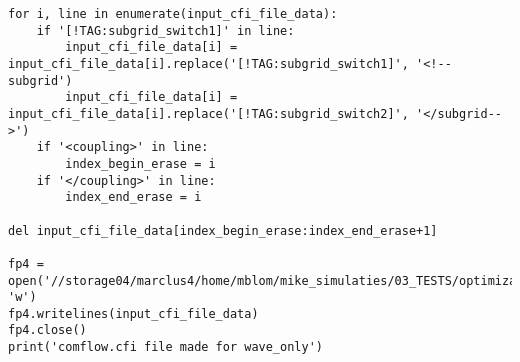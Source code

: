 \begin{mdframed}[backgroundcolor=light-gray, roundcorner=10pt,leftmargin=1, rightmargin=1, innerleftmargin=0, innertopmargin=7,innerbottommargin=0, outerlinewidth=1, linecolor=light-gray]
\begin{lstlisting}[linewidth=\columnwidth,caption= Script for creating comflow.cfi and  breakwater.in files ., label=script: creating comflow.cfi and breakwater.in]
for i, line in enumerate(input_cfi_file_data):
    if '[!TAG:subgrid_switch1]' in line:
        input_cfi_file_data[i] = input_cfi_file_data[i].replace('[!TAG:subgrid_switch1]', '<!--subgrid')
        input_cfi_file_data[i] = input_cfi_file_data[i].replace('[!TAG:subgrid_switch2]', '</subgrid-->')
    if '<coupling>' in line:
        index_begin_erase = i
    if '</coupling>' in line:
        index_end_erase = i

del input_cfi_file_data[index_begin_erase:index_end_erase+1]

fp4 = open('//storage04/marclus4/home/mblom/mike_simulaties/03_TESTS/optimization_clusterfolder/ComFLOW_simulations/wave_only/input_files/comflow.cfi'.format(i), 'w')
fp4.writelines(input_cfi_file_data)
fp4.close()
print('comflow.cfi file made for wave_only')



    
\end{lstlisting}
\end{mdframed}

